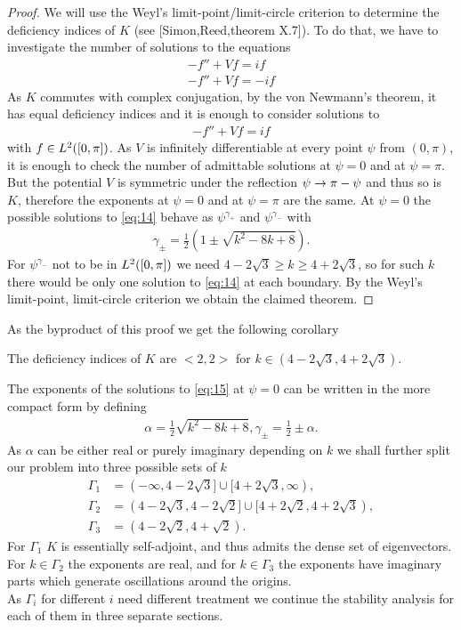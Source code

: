 \begin{proof}
  We will use the Weyl's limit-point/limit-circle criterion to
  determine the deficiency indices of $K$ (see [Simon,Reed,theorem
  X.7]). To do that, we have to investigate the number of solutions to
  the equations
  \begin{align}
    \label{eq:12}
    -f''+Vf=if\\
    -f''+Vf=-if
  \end{align}
  As $K$ commutes with complex conjugation, by the von Newmann's
  theorem, it has equal deficiency indices and it is enough to
  consider solutions to
  \begin{align}
    \label{eq:14}
    -f''+Vf=if
  \end{align}
  with $f\in L^2([0,\pi])$. As $V$ is infinitely differentiable at every point
  $\psi$ from $(0,\pi)$, it is enough to check the number of
  admittable solutions at $\psi=0$ and at $\psi=\pi$. But the
  potential $V$ is symmetric under the reflection $\psi\rightarrow\pi-\psi$
  and thus so is $K$, therefore the exponents at $\psi=0$ and at
  $\psi=\pi$ are the same. At $\psi=0$ the possible solutions to
  \eqref{eq:14} behave as $\psi^{\gamma_+}$ and $\psi^{\gamma_-}$ with
  \begin{align}
    \label{eq:10}
    \gamma_\pm=\frac{1}{2}\left(1\pm\sqrt{k^2-8k+8}\right).
  \end{align}
  For $\psi^{\gamma_-}$ not to be in $L^2([0,\pi])$ we need $4-2\sqrt{3}\ge
  k\ge4+2\sqrt{3}$, so for such $k$ there would be only one solution
  to \eqref{eq:14} at each boundary. By the Weyl's limit-point,
  limit-circle criterion we obtain the claimed theorem.
\end{proof}
As the byproduct of this proof we get the following corollary
\begin{corollary}
  The deficiency indices of $K$ are $<2,2>$ for
  $k\in(4-2\sqrt{3},4+2\sqrt{3})$.
\end{corollary}
The exponents of the solutions to \eqref{eq:15} at $\psi=0$ can be
written in the more compact form by defining
\begin{align}
  \label{eq:18}
  \alpha=\frac{1}{2}\sqrt{k^2-8k+8},
  \gamma_\pm=\frac{1}{2}\pm\alpha.
\end{align}
As $\alpha$ can be either real or purely imaginary depending on $k$ we
shall further split our problem into three possible sets of $k$
\begin{align}
  \label{eq:20}
  \Gamma_1&=(-\infty,4-2\sqrt{3}]\cup[4+2\sqrt{3},\infty),\\
  \Gamma_2&=(4-2\sqrt{3},4-2\sqrt{2}]\cup[4+2\sqrt{2},4+2\sqrt{3}),\\
  \Gamma_3&=(4-2\sqrt{2},4+\sqrt{2}).
\end{align}
For $\Gamma_1$ $K$ is essentially self-adjoint, and thus admits the
dense set of eigenvectors. For $k\in\Gamma_2$ the exponents are real,
and for $k\in\Gamma_3$ the exponents have imaginary parts which
generate oscillations around the origins.\\

As $\Gamma_i$ for different $i$ need different treatment we continue
the stability analysis for each of them in three separate sections.

